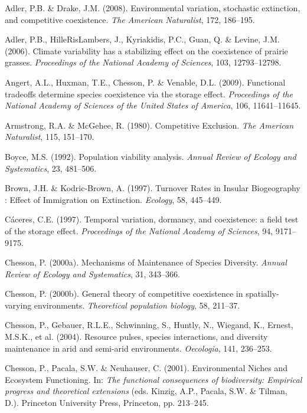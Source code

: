 \documentclass[12pt,]{article}
\begin{document}
\hypertarget{refs}{}
\hypertarget{ref-Adler2008}{}
Adler, P.B. \& Drake, J.M. (2008). Environmental variation, stochastic
extinction, and competitive coexistence. \emph{The American Naturalist},
172, 186--195.

\hypertarget{ref-Adler2006}{}
Adler, P.B., HilleRisLambers, J., Kyriakidis, P.C., Guan, Q. \& Levine,
J.M. (2006). Climate variability has a stabilizing effect on the
coexistence of prairie grasses. \emph{Proceedings of the National
Academy of Sciences}, 103, 12793--12798.

\hypertarget{ref-Angert2009}{}
Angert, A.L., Huxman, T.E., Chesson, P. \& Venable, D.L. (2009).
Functional tradeoffs determine species coexistence via the storage
effect. \emph{Proceedings of the National Academy of Sciences of the
United States of America}, 106, 11641--11645.

\hypertarget{ref-Armstrong1980}{}
Armstrong, R.A. \& McGehee, R. (1980). Competitive Exclusion. \emph{The
American Naturalist}, 115, 151--170.

\hypertarget{ref-Boyce1992}{}
Boyce, M.S. (1992). Population viability analysis. \emph{Annual Review
of Ecology and Systematics}, 23, 481--506.

\hypertarget{ref-Brown1997}{}
Brown, J.H. \& Kodric-Brown, A. (1997). Turnover Rates in Insular
Biogeography : Effect of Immigration on Extinction. \emph{Ecology}, 58,
445--449.

\hypertarget{ref-Caceres1997}{}
Cáceres, C.E. (1997). Temporal variation, dormancy, and coexistence: a
field test of the storage effect. \emph{Proceedings of the National
Academy of Sciences}, 94, 9171--9175.

\hypertarget{ref-Chesson2000}{}
Chesson, P. (2000a). Mechanisms of Maintenance of Species Diversity.
\emph{Annual Review of Ecology and Systematics}, 31, 343--366.

\hypertarget{ref-Chesson2000a}{}
Chesson, P. (2000b). General theory of competitive coexistence in
spatially-varying environments. \emph{Theoretical population biology},
58, 211--37.

\hypertarget{ref-Chesson2004}{}
Chesson, P., Gebauer, R.L.E., Schwinning, S., Huntly, N., Wiegand, K.,
Ernest, M.S.K., et al. (2004). Resource pulses, species interactions,
and diversity maintenance in arid and semi-arid environments.
\emph{Oecologia}, 141, 236--253.

\hypertarget{ref-Chesson2001}{}
Chesson, P., Pacala, S.W. \& Neuhauser, C. (2001). Environmental Niches
and Ecosystem Functioning. In: \emph{The functional consequences of
biodiversity: Empirical progress and theoretical extensions} (eds.
Kinzig, A.P., Pacala, S.W. \& Tilman, D.). Princeton University Press,
Princeton, pp. 213--245.
\end{document}
